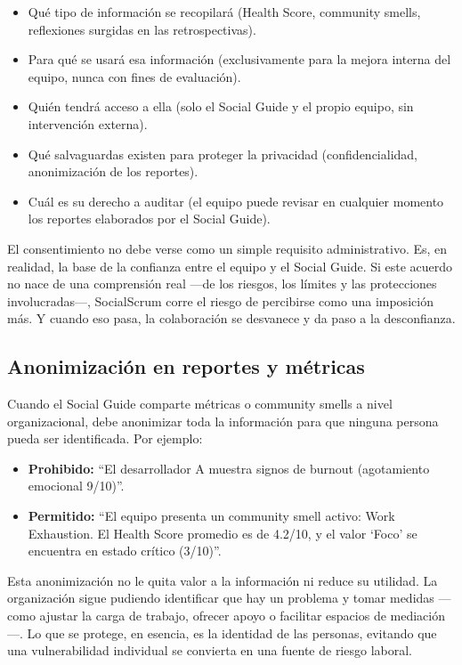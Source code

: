 \begin{itemize}
    \item Qué tipo de información se recopilará (Health Score, community smells, reflexiones surgidas en las retrospectivas).
    \item Para qué se usará esa información (exclusivamente para la mejora interna del equipo, nunca con fines de evaluación).
    \item Quién tendrá acceso a ella (solo el Social Guide y el propio equipo, sin intervención externa).
    \item Qué salvaguardas existen para proteger la privacidad (confidencialidad, anonimización de los reportes).
    \item Cuál es su derecho a auditar (el equipo puede revisar en cualquier momento los reportes elaborados por el Social Guide).
\end{itemize}

El consentimiento no debe verse como un simple requisito administrativo. Es, en realidad, la base de la confianza entre el equipo y el Social Guide. Si este acuerdo no nace de una comprensión real —de los riesgos, los límites y las protecciones involucradas—, SocialScrum corre el riesgo de percibirse como una imposición más. Y cuando eso pasa, la colaboración se desvanece y da paso a la desconfianza.

\subsection{Anonimización en reportes y métricas}

Cuando el Social Guide comparte métricas o community smells a nivel organizacional, debe anonimizar toda la información para que ninguna persona pueda ser identificada. Por ejemplo:

\begin{itemize}
    \item \textbf{Prohibido:} ``El desarrollador A muestra signos de burnout (agotamiento emocional 9/10)''.
    \item \textbf{Permitido:} ``El equipo presenta un community smell activo: Work Exhaustion. El Health Score promedio es de 4.2/10, y el valor ‘Foco’ se encuentra en estado crítico (3/10)''.
\end{itemize}

Esta anonimización no le quita valor a la información ni reduce su utilidad. La organización sigue pudiendo identificar que hay un problema y tomar medidas —como ajustar la carga de trabajo, ofrecer apoyo o facilitar espacios de mediación—. Lo que se protege, en esencia, es la identidad de las personas, evitando que una vulnerabilidad individual se convierta en una fuente de riesgo laboral.

